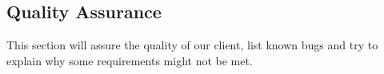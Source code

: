 \subsection{Quality Assurance}
This section will assure the quality of our client, list known bugs and try to explain why some requirements might not be met.




\newpage